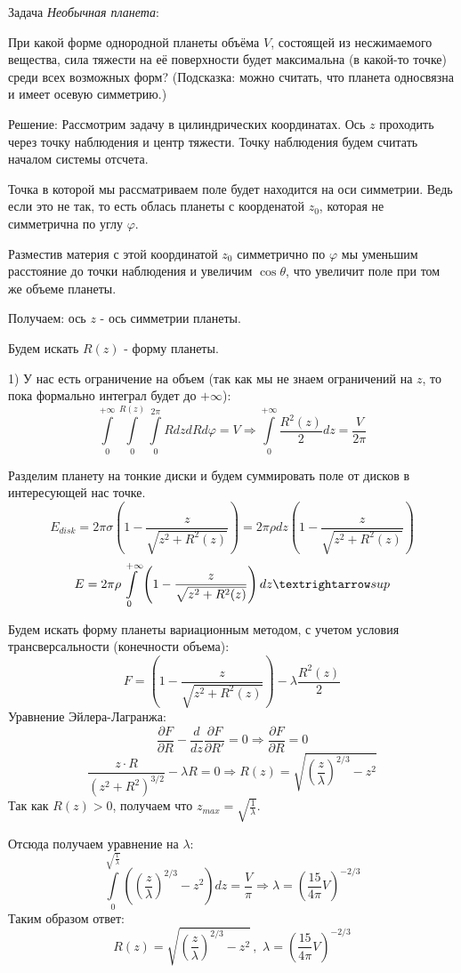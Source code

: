 \documentclass{article}
\begin{document}
Задача \textit{Необычная планета}:

При какой форме однородной планеты объёма $V$, состоящей из несжимаемого вещества, сила тяжести на её поверхности будет максимальна (в какой-то точке) среди всех возможных форм?
(Подсказка: можно считать, что планета односвязна и имеет осевую симметрию.)

Решение:
Рассмотрим задачу в цилиндрических координатах. Ось $z$ проходить через точку наблюдения и центр тяжести. Точку наблюдения будем считать началом системы отсчета.

Точка в которой мы рассматриваем поле будет находится на оси симметрии. Ведь если это не так, то есть облась планеты с коорденатой $z_0$, которая не симметрична по углу $\varphi$.

Разместив материя с этой координатой $z_0$ симметрично по $\varphi$ мы уменьшим расстояние до точки наблюдения и увеличим $\cos \theta$, что увеличит поле при том же объеме планеты.

Получаем: ось $z$ - ось симметрии планеты.

Будем искать $R(z)$ - форму планеты.
\par
\par 1) У нас есть ограничение на объем (так как мы не знаем ограничений на $z$, то пока формально интеграл будет до $+\infty$):
\[
 \int\limits_0^{+\infty} \int\limits_0^{R(z)} \int\limits_0^{2 \pi} R dz dR d\varphi=V \Rightarrow \int\limits_0^{+\infty} \frac{R^2(z)}{2}dz= \frac{V}{2 \pi}
\]
\par
\par Разделим планету на тонкие диски и будем суммировать поле от дисков в интересующей нас точке.
\[
E_{disk} = 2\pi \sigma \left( 1 - \frac{z}{\sqrt{z^2 + R^2(z)}} \right) = 2\pi \rho dz \left( 1 - \frac{z}{\sqrt{z^2 + R^2(z)}} \right)
\]
\[
E = 2\pi \rho \int\limits_0^{+\infty} \left( 1 - \frac{z}{\sqrt{z^2 + R^2(z)}} \right) dz \textrightarrow sup
\]

Будем искать форму планеты вариационным методом, с учетом условия трансверсальности (конечности объема):
\[
 F = \left( 1 - \frac{z}{\sqrt{z^2 + R^2(z)}} \right) -\lambda \frac{R^2(z)}{2}
\]
Уравнение Эйлера-Лагранжа:
\[
 \frac{\partial F}{\partial R} - \frac{d}{dz} \frac{\partial F}{\partial R'} = 0 \Rightarrow \frac{\partial F}{\partial R} = 0
\]
\[
 \frac{z \cdot R}{\left( z^2 + R^2 \right)^{3/2}} - \lambda R = 0  \Rightarrow R(z) = \sqrt{\left( \frac{z}{\lambda} \right)^{2/3} - z^2}
\]
Так как $R(z) > 0$, получаем что $z_{max} = \sqrt{\frac{1}{\lambda}}$.
\par Отсюда получаем уравнение на $\lambda$:
\[
 \int\limits_0^{\sqrt{\frac{1}{\lambda}}} \left( \left( \frac{z}{\lambda} \right)^{2/3} - z^2 \right)dz= \frac{V}{\pi} \Rightarrow \lambda = \left( \frac{15}{4 \pi} V \right)^{-2/3}
\]
Таким образом ответ:
\[
 R(z) = \sqrt{\left( \frac{z}{\lambda} \right)^{2/3} - z^2} \, , \,\,  \lambda = \left( \frac{15}{4 \pi} V \right)^{-2/3}
\]
\end{document}
